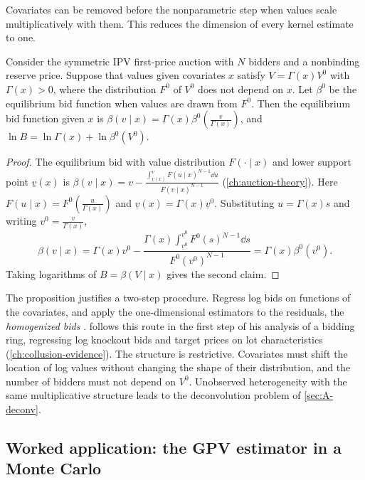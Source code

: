Covariates can be removed before the nonparametric step when values scale multiplicatively with them.
This reduces the dimension of every kernel estimate to one.

\begin{proposition}[Homogenization]\label{prop:A-homogenize}
Consider the symmetric IPV first-price auction with $N$ bidders and a nonbinding reserve price.
Suppose that values given covariates $x$ satisfy $V=\Gamma(x)V^0$ with $\Gamma(x)>0$, where the
distribution $F^0$ of $V^0$ does not depend on $x$. Let $\beta^0$ be the equilibrium bid function when values are drawn
from $F^0$. Then the equilibrium bid function given $x$ is $\beta(v\mid x)=\Gamma(x)\beta^0(\frac{v}{\Gamma(x)})$,
and $\ln B=\ln\Gamma(x)+\ln\beta^0(V^0)$.
\end{proposition}

\begin{proof}
The equilibrium bid with value distribution $F(\cdot\mid x)$ and lower support point $\underline v(x)$ is
$\beta(v\mid x)=v-\frac{\int_{\underline v(x)}^{v}F(u\mid x)^{N-1}\dd u}{F(v\mid x)^{N-1}}$
(\cref{ch:auction-theory}). Here $F(u\mid x)=F^0(\frac{u}{\Gamma(x)})$ and
$\underline v(x)=\Gamma(x)\underline v^0$. Substituting $u=\Gamma(x)s$ and writing $v^0=\frac{v}{\Gamma(x)}$,
\begin{equation*}
\beta(v\mid x)=\Gamma(x)v^0-\frac{\Gamma(x)\int_{\underline v^0}^{v^0}F^0(s)^{N-1}\dd s}{F^0(v^0)^{N-1}}
=\Gamma(x)\beta^0(v^0).
\end{equation*}
Taking logarithms of $B=\beta(V\mid x)$ gives the second claim.
\end{proof}

The proposition justifies a two-step procedure. Regress log bids on functions of the covariates, and
apply the one-dimensional estimators to the residuals, the \emph{homogenized bids}
\citep{HaileHongShum2003}. \citet{Asker2010} follows this route in the first step of his analysis of a
bidding ring, regressing log knockout bids and target prices on lot characteristics
(\cref{ch:collusion-evidence}). The structure is restrictive. Covariates must shift the location of log
values without changing the shape of their distribution, and the number of bidders must not depend on
$V^0$. Unobserved heterogeneity with the same multiplicative structure leads to the deconvolution
problem of \cref{sec:A-deconv}.

\subsection{Worked application: the GPV estimator in a Monte Carlo}\label{sec:A-gpv-mc}

